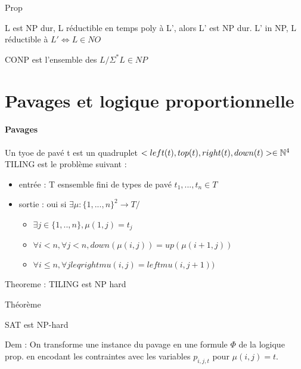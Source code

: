 \documentclass[10pt,a4paper]{article}
\begin{document}
 \subparagraph*{Prop} L est NP dur, L réductible en temps poly à L', alors L' est NP dur.
 L' in NP, L réductible à $L' \Leftrightarrow L \in NO$
 
 \begin{definition}{}CONP est l'ensemble des $L / \Sigma^* L \in NP$
 \end{definition}
 \part{Pavages et logique proportionnelle}
 
 \subsection{Pavages} Un tyoe de pavé t est un quadruplet $< left(t), top(t), right(t), down(t) > \in \mathbb{N} ^4$
 TILING est le problème suivant : \begin{itemize}
 \item entrée : T esnsemble fini de types de pavé $t_1, ..., t_n \in T$
\item sortie : oui si $\exists \mu : \{ 1, ..., n\} ^2 \rightarrow T /$ \begin{itemize}
\item $\exists j \in \{1, .., n\}, \mu(1,j) = t_j$
\item $\forall i < n, \forall j < n, down(\mu(i,j)) = up(\mu(i+1, j))$
\item $\forall i \leq n , \forall j leq right mu (i,j) = leftmu (i, j+1))$
\end{itemize}
\end{itemize}

Theoreme : TILING est NP hard

\subparagraph*{Théorème} SAT est NP-hard

Dem : On transforme une instance du pavage en une formule $\Phi$ de la logique prop. en encodant les contraintes avec les variables $p_{i,j,t}$ pour $\mu(i,j) = t$.
\end{document}
